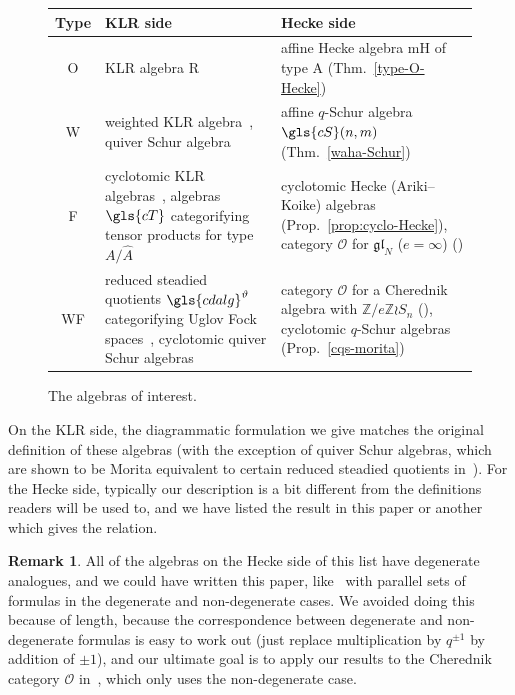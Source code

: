 \documentclass[10pt]{article}
\theoremstyle{definition}
\newtheorem{rema}[theorem]{Remark}
\newcommand{\Z}{\mathbb{Z}}
\newcommand{\cO}{\mathcal{O}}
\begin{document}
\begin{figure}[htb]\label{table-of-algebras} \centering
\renewcommand{\arraystretch}{1.4}
 \begin{tabular}{|c|p{43mm}|p{68mm}|} 
 \hline
 Type& KLR side & Hecke side \\
\hline 
O&KLR algebra \gls{R}~\cite{KLI,Rou2KM}
& affine Hecke algebra \gls{mH} of type A (Thm.~\ref{type-O-Hecke})\\ 
\hline
W& weighted KLR algebra~\cite{WebwKLR}, quiver Schur algebra~\cite{SWschur} & 
affine $q$-Schur algebra $\gls{cS}(n,m)$ (Thm.~\ref{waha-Schur})\\ 
\hline
F& cyclotomic KLR algebras~\cite{KLI}, algebras $\gls{cT}$ categorifying tensor products 
for type $A/\hat{A}$~\cite{Webmerged} &
cyclotomic Hecke (Ariki--Koike) algebras (Prop.~\ref{prop:cyclo-Hecke}), 
category $\cO$ for $\mathfrak{gl}_N$ ($e=\infty$) (\cite[9.11]{Webmerged})\\ 
\hline
WF& reduced steadied quotients $\gls{cdalg}^\vartheta$ categorifying Uglov Fock spaces~\cite{WebRou}, cyclotomic quiver Schur algebras~\cite{SWschur}&
 category $\cO$ for a
Cherednik algebra with $\Z/e\Z\wr S_n$ (\cite[Thm.~A]{WebRou}),
cyclotomic $q$-Schur algebras (Prop.~\ref{cqs-morita}) \\ 
\hline
\end{tabular}
\caption{The algebras of interest.}
\end{figure}
 
 
 
On the KLR side, the diagrammatic formulation we give matches the
original definition of these algebras (with the exception of quiver
Schur algebras, which are shown to be Morita equivalent to certain
reduced steadied quotients in~\cite[Th.~3.9]{WebwKLR}). For
the Hecke side, typically our description is a bit different from the
definitions readers will be used to, and we have
listed the result in this paper or another which gives the relation.

\begin{rema}
 All of the algebras on the Hecke side of this list have degenerate
 analogues, and we could have written this paper, like~\cite{BKKL}
 with parallel sets of formulas in the degenerate and non-degenerate
 cases. We avoided doing this because of length, because the correspondence between
 degenerate and non-degenerate formulas is easy to work out (just replace
 multiplication by $q^{\pm 1}$ by addition of $\pm 1$), and our
 ultimate goal is to apply our results to the Cherednik category
 $\cO$ in~\cite{WebRou},
 which only uses the non-degenerate case. 
\end{rema}
\end{document}
